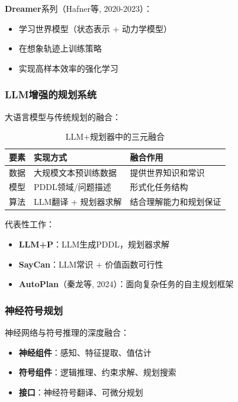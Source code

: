 \documentclass[12pt,a4paper]{ctexart}
\begin{document}
\textbf{Dreamer}系列（Hafner等, 2020-2023）：
\begin{itemize}[leftmargin=2em]
    \item 学习世界模型（状态表示 + 动力学模型）
    \item 在想象轨迹上训练策略
    \item 实现高样本效率的强化学习
\end{itemize}

\subsubsection{LLM增强的规划系统}

大语言模型与传统规划的融合：

\begin{table}[htbp]
\centering
\caption{LLM+规划器中的三元融合}
\begin{tabular}{p{2cm}p{4cm}p{5cm}}
\toprule
\textbf{要素} & \textbf{实现方式} & \textbf{融合作用} \\
\midrule
数据 & 大规模文本预训练数据 & 提供世界知识和常识 \\
模型 & PDDL领域/问题描述 & 形式化任务结构 \\
算法 & LLM翻译 + 规划器求解 & 结合理解能力和规划保证 \\
\bottomrule
\end{tabular}
\end{table}

代表性工作：
\begin{itemize}[leftmargin=2em]
    \item \textbf{LLM+P}：LLM生成PDDL，规划器求解
    \item \textbf{SayCan}：LLM常识 + 价值函数可行性
    \item \textbf{AutoPlan}（秦龙等, 2024）：面向复杂任务的自主规划框架
\end{itemize}

\subsubsection{神经符号规划}

神经网络与符号推理的深度融合：

\begin{itemize}[leftmargin=2em]
    \item \textbf{神经组件}：感知、特征提取、值估计
    \item \textbf{符号组件}：逻辑推理、约束求解、规划搜索
    \item \textbf{接口}：神经符号翻译、可微分规划
\end{itemize}
\end{document}
